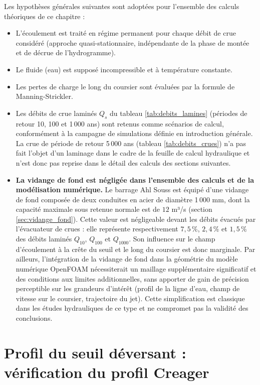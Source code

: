 Les hypothèses générales suivantes sont adoptées pour l'ensemble des calculs théoriques de ce chapitre :
\begin{itemize}
    \item L'écoulement est traité en régime permanent pour chaque débit de crue considéré (approche quasi-stationnaire, indépendante de la phase de montée et de décrue de l'hydrogramme).
    \item Le fluide (eau) est supposé incompressible et à température constante.
    \item Les pertes de charge le long du coursier sont évaluées par la formule de Manning-Strickler.
    \item Les débits de crue laminés $Q_s$ du tableau \ref{tab:debits_lamines} (périodes de retour 10, 100 et 1\,000 ans) sont retenus comme scénarios de calcul, conformément à la campagne de simulations définie en introduction générale. La crue de période de retour 5\,000 ans (tableau \ref{tab:debits_crues}) n'a pas fait l'objet d'un laminage dans le cadre de la feuille de calcul hydraulique et n'est donc pas reprise dans le détail des calculs des sections suivantes.
    \item \textbf{La vidange de fond est négligée dans l'ensemble des calculs et de la modélisation numérique.} Le barrage Ahl Souss est équipé d'une vidange de fond composée de deux conduites en acier de diamètre 1\,000 mm, dont la capacité maximale sous retenue normale est de $12$ m³/s \cite{fiche_organes_restitution, note_calcul_vidange} (section \ref{sec:vidange_fond}). Cette valeur est négligeable devant les débits évacués par l'évacuateur de crues : elle représente respectivement $7{,}5\,\%$, $2{,}4\,\%$ et $1{,}5\,\%$ des débits laminés $Q_{10}$, $Q_{100}$ et $Q_{1000}$. Son influence sur le champ d'écoulement à la crête du seuil et le long du coursier est donc marginale. Par ailleurs, l'intégration de la vidange de fond dans la géométrie du modèle numérique OpenFOAM nécessiterait un maillage supplémentaire significatif et des conditions aux limites additionnelles, sans apporter de gain de précision perceptible sur les grandeurs d'intérêt (profil de la ligne d'eau, champ de vitesse sur le coursier, trajectoire du jet). Cette simplification est classique dans les études hydrauliques de ce type et ne compromet pas la validité des conclusions.
\end{itemize}

\section{Profil du seuil déversant : vérification du profil Creager}
\label{sec:profil_seuil}

